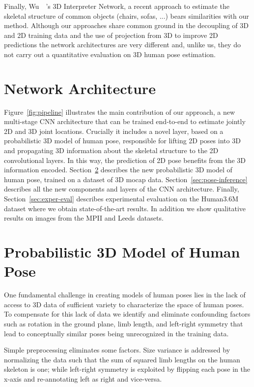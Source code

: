 \documentclass[10pt,twocolumn,letterpaper]{article}
\begin{document}
Finally, Wu~\etal~\cite{wu2016single}'s 3D Interpreter Network, a
recent approach to estimate the skeletal structure of common objects
(chairs, sofas, ...) bears similarities with our method. Although our
approaches share common ground in the decoupling of 3D and 2D training
data and the use of projection from 3D to improve 2D predictions the
network architectures are very different and, unlike us, they do not
carry out a quantitative evaluation on 3D human pose
estimation.


\section{Network Architecture}

Figure~\ref{fig:pipeline} illustrates the main contribution of our
approach, a new multi-stage CNN architecture that can be trained
end-to-end to estimate jointly 2D and 3D joint locations. Crucially it
includes a novel layer, based on a probabilistic 3D model of human
pose, responsible for lifting 2D poses into 3D and propagating 3D
information about the skeletal structure to the 2D convolutional
layers. In this way, the prediction of 2D pose benefits from the 3D
information encoded. Section~\ref{sec:modeling-3D-poses} describes the
new probabilistic 3D model of human pose, trained on a dataset of 3D
mocap data. Section~\ref{sec:pose-inference} describes all the new
components and layers of the  CNN architecture. Finally,
Section~\ref{sec:exper-eval} describes experimental evaluation on
the Human3.6M dataset where we obtain state-of-the-art results. In
addition we show qualitative results on images from the MPII and Leeds datasets.

\section{Probabilistic 3D Model of Human Pose}
\label{sec:modeling-3D-poses}

One fundamental challenge in creating models of human poses lies in
the lack of access to 3D data of sufficient variety to characterize
the space of human poses. To compensate for this lack of data
we identify and eliminate confounding factors such as rotation in the
ground plane, limb length, and left-right symmetry that lead to
conceptually similar poses being unrecognized in the training data.


Simple preprocessing eliminates some factors. Size variance is addressed by
normalizing the data such that the sum of squared limb lengths on the human
skeleton is one; while left-right symmetry is exploited by flipping each pose in
the x-axis and re-annotating left as right and vice-versa.
\end{document}
